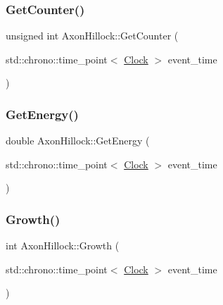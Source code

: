 \mbox{\label{classAxonHillock_a429c9876d679fe8de4533725afc4875c}} 
\subsubsection{\texorpdfstring{Get\+Counter()}{GetCounter()}}
{\footnotesize\ttfamily unsigned int Axon\+Hillock\+::\+Get\+Counter (\begin{DoxyParamCaption}\item[{std\+::chrono\+::time\+\_\+point$<$ \mbox{\hyperlink{universe_8h_a0ef8d951d1ca5ab3cfaf7ab4c7a6fd80}{Clock}} $>$}]{event\+\_\+time }\end{DoxyParamCaption})\hspace{0.3cm}{\ttfamily [inline]}}

\mbox{\label{classAxonHillock_ab5ac3ab8771b96acf7e3fa07152525a5}} 
\subsubsection{\texorpdfstring{Get\+Energy()}{GetEnergy()}}
{\footnotesize\ttfamily double Axon\+Hillock\+::\+Get\+Energy (\begin{DoxyParamCaption}\item[{std\+::chrono\+::time\+\_\+point$<$ \mbox{\hyperlink{universe_8h_a0ef8d951d1ca5ab3cfaf7ab4c7a6fd80}{Clock}} $>$}]{event\+\_\+time }\end{DoxyParamCaption})\hspace{0.3cm}{\ttfamily [inline]}}

\mbox{\label{classAxonHillock_a5c5cd9008f1410898980528b959d668e}} 
\subsubsection{\texorpdfstring{Growth()}{Growth()}}
{\footnotesize\ttfamily int Axon\+Hillock\+::\+Growth (\begin{DoxyParamCaption}\item[{std\+::chrono\+::time\+\_\+point$<$ \mbox{\hyperlink{universe_8h_a0ef8d951d1ca5ab3cfaf7ab4c7a6fd80}{Clock}} $>$}]{event\+\_\+time }\end{DoxyParamCaption})}

